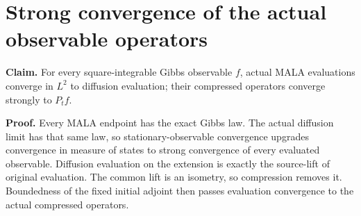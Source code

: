 \documentclass[11pt,a4paper]{article}
\begin{document}
\section{\texorpdfstring{Strong convergence of the actual observable operators}{Strong convergence of the actual observable operators}}


\textbf{Claim.} For every square-integrable Gibbs observable \(f\), actual MALA evaluations converge in \(L^2\) to diffusion evaluation; their compressed operators converge strongly to \(P_tf\).



\textbf{Proof.} Every MALA endpoint has the exact Gibbs law. The actual diffusion limit has that same law, so stationary-observable convergence upgrades convergence in measure of states to strong convergence of every evaluated observable. Diffusion evaluation on the extension is exactly the source-lift of original evaluation. The common lift is an isometry, so compression removes it. Boundedness of the fixed initial adjoint then passes evaluation convergence to the actual compressed operators.
\end{document}
